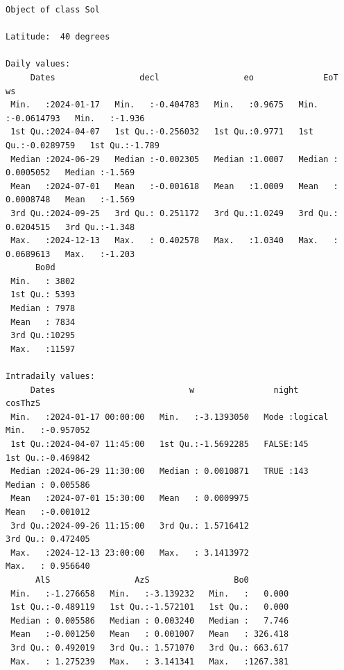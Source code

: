 \begin{verbatim}
Object of class Sol 

Latitude:  40 degrees

Daily values:
     Dates                 decl                 eo              EoT                   ws        
 Min.   :2024-01-17   Min.   :-0.404783   Min.   :0.9675   Min.   :-0.0614793   Min.   :-1.936  
 1st Qu.:2024-04-07   1st Qu.:-0.256032   1st Qu.:0.9771   1st Qu.:-0.0289759   1st Qu.:-1.789  
 Median :2024-06-29   Median :-0.002305   Median :1.0007   Median : 0.0005052   Median :-1.569  
 Mean   :2024-07-01   Mean   :-0.001618   Mean   :1.0009   Mean   : 0.0008748   Mean   :-1.569  
 3rd Qu.:2024-09-25   3rd Qu.: 0.251172   3rd Qu.:1.0249   3rd Qu.: 0.0204515   3rd Qu.:-1.348  
 Max.   :2024-12-13   Max.   : 0.402578   Max.   :1.0340   Max.   : 0.0689613   Max.   :-1.203  
      Bo0d      
 Min.   : 3802  
 1st Qu.: 5393  
 Median : 7978  
 Mean   : 7834  
 3rd Qu.:10295  
 Max.   :11597  

Intradaily values: 
     Dates                           w                night            cosThzS         
 Min.   :2024-01-17 00:00:00   Min.   :-3.1393050   Mode :logical   Min.   :-0.957052  
 1st Qu.:2024-04-07 11:45:00   1st Qu.:-1.5692285   FALSE:145       1st Qu.:-0.469842  
 Median :2024-06-29 11:30:00   Median : 0.0010871   TRUE :143       Median : 0.005586  
 Mean   :2024-07-01 15:30:00   Mean   : 0.0009975                   Mean   :-0.001012  
 3rd Qu.:2024-09-26 11:15:00   3rd Qu.: 1.5716412                   3rd Qu.: 0.472405  
 Max.   :2024-12-13 23:00:00   Max.   : 3.1413972                   Max.   : 0.956640  
      AlS                 AzS                 Bo0          
 Min.   :-1.276658   Min.   :-3.139232   Min.   :   0.000  
 1st Qu.:-0.489119   1st Qu.:-1.572101   1st Qu.:   0.000  
 Median : 0.005586   Median : 0.003240   Median :   7.746  
 Mean   :-0.001250   Mean   : 0.001007   Mean   : 326.418  
 3rd Qu.: 0.492019   3rd Qu.: 1.571070   3rd Qu.: 663.617  
 Max.   : 1.275239   Max.   : 3.141341   Max.   :1267.381
\end{verbatim}

